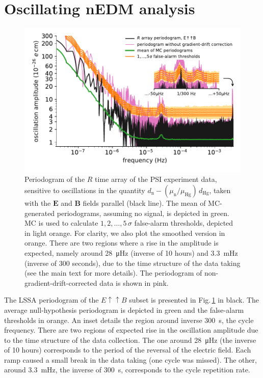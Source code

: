 \section{Oscillating nEDM analysis}
\begin{figure}
  \centering
  \includegraphics[width=\linewidth]{gfx/axions/detection_psi_inset_gc.pdf}
  \caption{Periodogram of the $R$ time array of the PSI experiment data, sensitive to oscillations in the quantity $d_\mathrm{n} - \left( \mu_\mathrm{n} / \mu_\mathrm{Hg} \right) \, d_\mathrm{Hg}$, taken with the $\boldsymbol{E}$ and $\boldsymbol{B}$ fields parallel (black line).
  The mean of MC-generated periodograms, assuming no signal, is depicted in green. MC is used to calculate $1,2,…,5\,\sigma$ false-alarm thresholds, depicted in light orange.
  For clarity, we also plot the smoothed version in orange.
  There are two regions where a rise in the amplitude is expected, namely around \SI{28}{\micro\hertz} (inverse of 10 hours) and \SI{3.3}{\milli\hertz} (inverse of 300 seconds), due to the time structure of the data taking (see the main text for more details). The periodogram of non-gradient-drift-corrected data is shown in pink.}\label{fig:axions_PSI_detection}
\end{figure}

The LSSA periodogram of the $E \uparrow \uparrow B$ subset is presented in Fig.\,\ref{fig:axions_PSI_detection} in black. The average null-hypothesis periodogram is depicted in green and the false-alarm thresholds in orange. An inset details the region around inverse \SI{300}{\second}, the cycle frequency.
There are two regions of expected rise in the oscillation amplitude due to the time structure of the data collection.
The one around \SI{28}{\micro\hertz} (the inverse of 10 hours) corresponds to the period of the reversal of the electric field. Each ramp caused a small break in the data taking (one cycle was missed).
The other, around \SI{3.3}{\milli\hertz}, the inverse of \SI{300}{\second}, corresponds to the cycle repetition rate.

